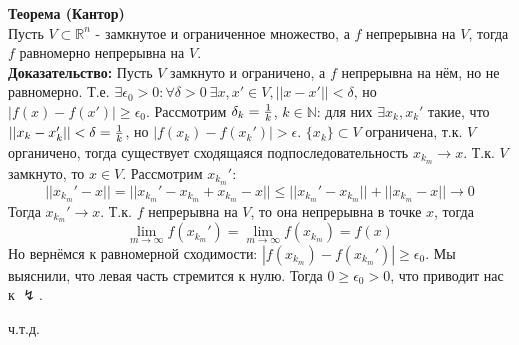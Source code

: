 \documentclass[book, 11pt]{report}
\begin{document}
        \par{\textbf{Теорема (Кантор)}\\
        Пусть $V\subset\mathbb{R}^n$ - замкнутое и ограниченное множество, а $f$ непрерывна на $V$, тогда $f$ равномерно непрерывна на $V$.\\
        \textbf{Доказательство: }Пусть $V$ замкнуто и ограничено, а $f$ непрерывна на нём, но не равномерно. Т.е. $\exists\epsilon_0>0:\forall\delta>0 \ \exists x,x'\in V, ||x-x'||<\delta$, но $|f(x)-f(x')|\geq\epsilon_0$. Рассмотрим $\delta_k={1\over k}$, $k\in\mathbb{N}$: для них $\exists x_k,x_k'$ такие, что $||x_k-x_k'||<\delta={1\over k}$, но $|f(x_k)-f(x_k')|>\epsilon$. $\{x_k\}\subset V$ ограничена, т.к. $V$ органичено, тогда существует сходящаяся подпоследовательность $x_{k_m}\to x$. Т.к. $V$ замкнуто, то $x\in V$. Рассмотрим $x_{k_m}'$:
        \begin{equation*}
            ||x_{k_m}'-x||=||x_{k_m}'-x_{k_m}+x_{k_m}-x||\leq||x_{k_m}'-x_{k_m}||+||x_{k_m}-x||\to0
        \end{equation*}
        Тогда $x_{k_m}'\to x$. Т.к. $f$ непрерывна на $V$, то она непрерывна в точке $x$, тогда
        \begin{equation*}
        \displaystyle\lim_{m\to\infty}f(x_{k_m}')=\lim_{m\to\infty}f(x_{k_m})=f(x)
        \end{equation*}
        Но вернёмся к равномерной сходимости: $|f(x_{k_m})-f(x_{k_m}')|\geq\epsilon_0$. Мы выяснили, что левая часть стремится к нулю. Тогда $0\geq\epsilon_0>0$, что приводит нас к $\lightning$.
        }
        \par{{\raggedleft ч.т.д.\par}}
        \vspace{0.6cm}
\end{document}
